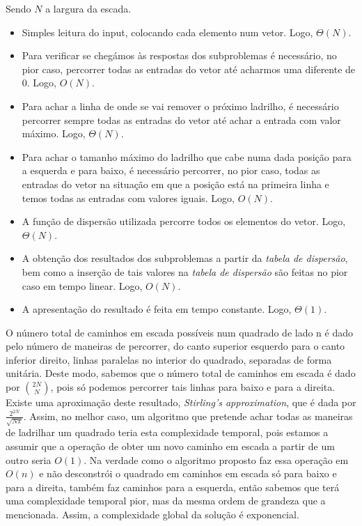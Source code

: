 \documentclass[12pt,a4paper]{article}
\begin{document}
  Sendo $N$ a largura da escada.

  \begin{itemize}
    \setlength{\itemsep}{0pt}
    \item Simples leitura do input, colocando cada elemento num vetor. Logo, $\Theta(N)$.
    \item Para verificar se chegámos às respostas dos subproblemas é necessário, no pior caso, percorrer todas as entradas do vetor até acharmos uma diferente de 0. Logo, $O(N)$.
    \item Para achar a linha de onde se vai remover o próximo ladrilho, é necessário percorrer sempre todas as entradas do vetor até achar a entrada com valor máximo. Logo, $\Theta(N)$.
    \item Para achar o tamanho máximo do ladrilho que cabe numa dada posição para a esquerda e para baixo, é necessário percorrer, no pior caso, todas as entradas do vetor na situação em que a posição está na primeira linha e temos todas as entradas com valores iguais. Logo, $O(N)$.
    \item A função de dispersão utilizada percorre todos os elementos do vetor. Logo, $\Theta(N)$.
    \item A obtenção dos resultados dos subproblemas a partir da \textit{tabela de dispersão}, bem como a inserção de tais valores na \textit{tabela de dispersão} são feitas no pior caso em tempo linear. Logo, $O(N)$.
    \item A apresentação do resultado é feita em tempo constante. Logo, $\Theta(1)$.
  \end{itemize}

  O número total de caminhos em escada possíveis num quadrado de lado n é dado pelo número de maneiras de percorrer, do canto superior esquerdo para o canto inferior direito, linhas paralelas no interior do quadrado, separadas de forma unitária.
  Deste modo, sabemos que o número total de caminhos em escada é dado por $2N \choose N$, pois só podemos percorrer tais linhas para baixo e para a direita.
  Existe uma aproximação deste resultado, \textit{Stirling's approximation}\cite{enwiki:1126871905}, que é dada por $\frac{2^{2N}}{\sqrt{N\pi}}$.
  Assim, no melhor caso, um algoritmo que pretende achar todas as maneiras de ladrilhar um quadrado teria esta complexidade temporal, pois estamos a assumir que a operação de obter um novo caminho em escada a partir de um outro seria $O(1)$.
  Na verdade como o algoritmo proposto faz essa operação em $O(n)$ e não desconstrói o quadrado em caminhos em escada só para baixo e para a direita, também faz caminhos para a esquerda, então sabemos que terá uma complexidade temporal pior, mas da mesma ordem de grandeza que a mencionada.
  Assim, a complexidade global da solução é exponencial.
\end{document}
